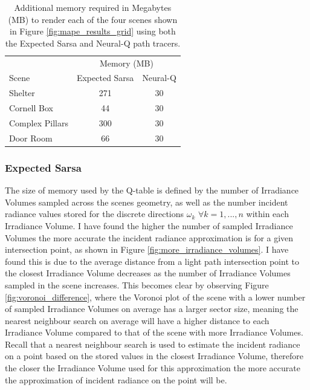 \documentclass[../dissertation.tex]{subfiles}
\begin{document}
\begin{table}[h]
	\centering
	\begin{tabular}{lcc}
		\toprule
		& \multicolumn{2}{c}{Memory (MB)} \\ \cmidrule(lr){2-3}
		Scene & Expected Sarsa & Neural-Q \\
		\midrule
		Shelter & 271 & 30 \\
		Cornell Box & 44 & 30 \\
		Complex Pillars & 300 & 30 \\
		Door Room & 66 & 30 \\
		\bottomrule
	\end{tabular}
	\caption{Additional memory required in Megabytes (MB) to render each of the four scenes shown in Figure \ref{fig:mape_results_grid} using both the Expected Sarsa and Neural-Q path tracers.}
	\label{tab-label}
\end{table}

\subsubsection{Expected Sarsa}

The size of memory used by the Q-table is defined by the number of Irradiance Volumes sampled across the scenes geometry, as well as the number incident radiance values stored for the discrete directions $\omega_k$ $\forall k = 1,...,n$  within each Irradiance Volume. I have found the higher the number of sampled Irradiance Volumes the more accurate the incident radiance approximation is for a given intersection point, as shown in Figure \ref{fig:more_irradiance_volumes}.  I have found this is due to the average distance from a light path intersection point to the closest Irradiance Volume decreases as the number of Irradiance Volumes sampled in the scene increases. This becomes clear by observing Figure \ref{fig:voronoi_difference}, where the Voronoi plot of the scene with a lower number of sampled Irradiance Volumes on average has a larger sector size, meaning the nearest neighbour search on average will have a higher distance to each Irradiance Volume compared to that of the scene with more Irradiance Volumes. Recall that a nearest neighbour search is used to estimate the incident radiance on a point based on the stored values in the closest Irradiance Volume, therefore the closer the Irradiance Volume used for this approximation the more accurate the approximation of incident radiance on the point will be.\\
\end{document}
